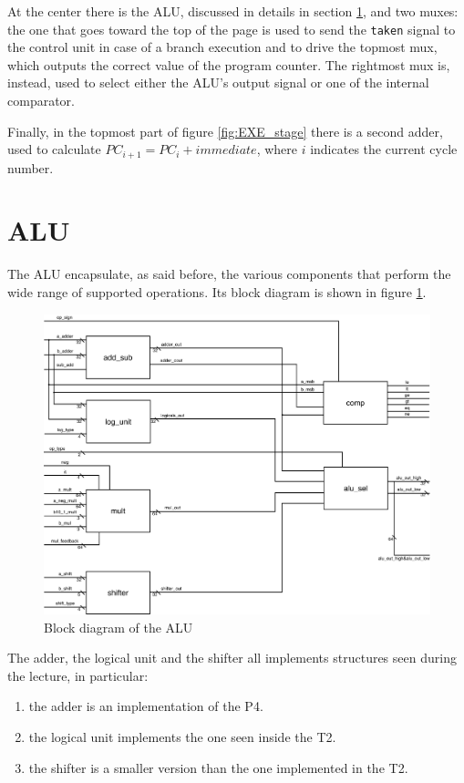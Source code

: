 At the center there is the ALU, discussed in details in section \ref{sec:alu}, and two muxes: the one that goes toward the top of the page is used to send
the \verb|taken| signal to the control unit in case of a branch execution and to drive the topmost mux, which outputs the correct value of the program counter.
The rightmost mux is, instead, used to select either the ALU's output signal or one of the internal comparator.

Finally, in the topmost part of figure \ref{fig:EXE_stage} there is a second adder, used to calculate $PC_{i+1} = PC_{i} + immediate$, where $i$ indicates the
current cycle number.

\section{ALU}
\label{sec:alu}

The ALU encapsulate, as said before, the various components that perform the wide range of supported operations. Its block diagram is shown in figure \ref{fig:alu}.

\begin{figure}[!ht]
	\centering
	\includegraphics[width=0.8\linewidth]{./chapters/figures/ALU_exe.pdf}
	\caption{Block diagram of the ALU}
	\label{fig:alu}
\end{figure}

The adder, the logical unit and the shifter all implements structures seen during the lecture, in particular:

\begin{enumerate}
    \item the adder is an implementation of the P4.
    \item the logical unit implements the one seen inside the T2.
    \item the shifter is a smaller version than the one implemented in the T2.
\end{enumerate}

